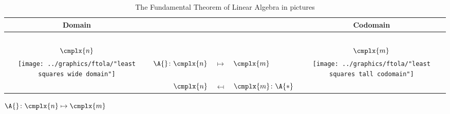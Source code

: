 \documentclass{amsbook}
\begin{document}
  \begin{table}[htdp]  %
    \caption[The Fundamental Theorem of Linear Algebra in pictures]{The Fundamental Theorem of Linear Algebra in pictures}
    \begin{center}
    		\begin{tabular}{crclc}
		      Domain &&&& Codomain \\\hline
		      \ \\
		  		$\cmplx{n}$ &&&& $\cmplx{m}$ \\
    		  \texttt{[image: ../graphics/ftola/"least squares wide domain"]}
		  		  & $\A{} \colon \cmplx{n}$ & $\mapsto$ & $\cmplx{m} $ &
		      \texttt{[image: ../graphics/ftola/"least squares tall codomain"]} \\
		        & $\cmplx{n}$ & $\mapsfrom$ & $\cmplx{m} \colon \A{*}$ \\
      \end{tabular}
    \end{center}
  \end{table}%

\begin{center}
  \parbox{2cm}{\centering $\A{} \colon \cmplx{n} \mapsto \cmplx{m} $}
\end{center}
\end{document}
